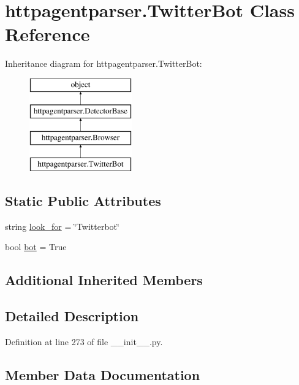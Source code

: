 \hypertarget{classhttpagentparser_1_1_twitter_bot}{}\section{httpagentparser.\+Twitter\+Bot Class Reference}
\label{classhttpagentparser_1_1_twitter_bot}
Inheritance diagram for httpagentparser.\+Twitter\+Bot\+:\begin{figure}[H]
\begin{center}
\leavevmode
\includegraphics[height=4.000000cm]{classhttpagentparser_1_1_twitter_bot}
\end{center}
\end{figure}
\subsection*{Static Public Attributes}
\begin{DoxyCompactItemize}
\item 
string \hyperlink{classhttpagentparser_1_1_twitter_bot_a16632e63bd940ef71deb0563fdfcd41e}{look\+\_\+for} = \char`\"{}Twitterbot\char`\"{}
\item 
bool \hyperlink{classhttpagentparser_1_1_twitter_bot_adc8273938e6cb7ae355f61b8d398b164}{bot} = True
\end{DoxyCompactItemize}
\subsection*{Additional Inherited Members}


\subsection{Detailed Description}


Definition at line 273 of file \+\_\+\+\_\+init\+\_\+\+\_\+.\+py.



\subsection{Member Data Documentation}
\hypertarget{classhttpagentparser_1_1_twitter_bot_adc8273938e6cb7ae355f61b8d398b164}{}\label{classhttpagentparser_1_1_twitter_bot_adc8273938e6cb7ae355f61b8d398b164} 
